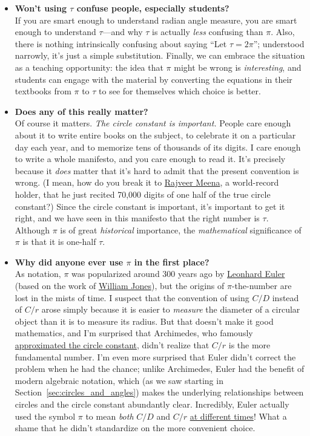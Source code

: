 \begin{itemize}
  \item \textbf{Won't using $\tau$ confuse people, especially students?} \\  If you are smart enough to understand radian angle measure, you are smart enough to understand $\tau$---and  why $\tau$ is actually \emph{less} confusing than $\pi$. Also, there is nothing intrinsically confusing about saying ``Let $\tau = 2\pi$''; understood narrowly, it's just a simple substitution. Finally, we can embrace the situation as a teaching opportunity: the idea that $\pi$ might be wrong is \emph{interesting}, and students can engage with the material by converting the equations in their textbooks from $\pi$ to $\tau$ to see for themselves which choice is better.

  \item \textbf{Does any of this really matter?} \\ Of course it matters. \emph{The circle constant is important.} People care enough about it to write entire books on the subject, to celebrate it on a particular day each year, and to memorize tens of thousands of its digits. I care enough to write a whole manifesto, and you care enough to read it. It's precisely because it \emph{does} matter that it's hard to admit that the present convention is wrong. (I mean, how do you break it to \href{https://www.guinnessworldrecords.com/world-records/most-pi-places-memorised}{Rajveer Meena}, a world-record holder, that he just recited 70,000 digits of one half of the true circle constant?) Since the circle constant is important, it's important to get it right, and we have seen in this manifesto that the right number is $\tau$. Although $\pi$ is of great \emph{historical} importance, the \emph{mathematical} significance of $\pi$ is that it is one-half $\tau$.

  \item \textbf{Why did anyone ever use $\pi$ in the first place?} \\ As notation, $\pi$ was popularized around 300 years ago by \href{https://en.wikipedia.org/wiki/Leonhard_Euler}{Leonhard Euler} (based on the work of \href{https://en.wikipedia.org/wiki/William_Jones_(mathematician)}{William Jones}), but the origins of $\pi$-the-number are lost in the mists of time. I suspect that the convention of using $C/D$ instead of $C/r$ arose simply because it is easier to \emph{measure} the diameter of a circular object than it is to measure its radius. But that doesn't make it good mathematics, and I'm surprised that Archimedes, who famously \href{http://itech.fgcu.edu/faculty/clindsey/mhf4404/archimedes/archimedes.html}{approximated the circle constant}, didn't realize that $C/r$ is the more fundamental number. I'm even more surprised that Euler didn't correct the problem when he had the chance; unlike Archimedes, Euler had the benefit of modern algebraic notation, which (as we saw starting in Section~\ref{sec:circles_and_angles}) makes the underlying relationships between circles and the circle constant abundantly clear. Incredibly, Euler actually used the symbol $\pi$ to mean \emph{both} $C/D$ and $C/r$ \href{https://en.wikipedia.org/wiki/Pi#Adoption_of_the_symbol_%CF%80}{at different times}! What a shame that he didn't standardize on the more convenient choice.


\end{itemize}
